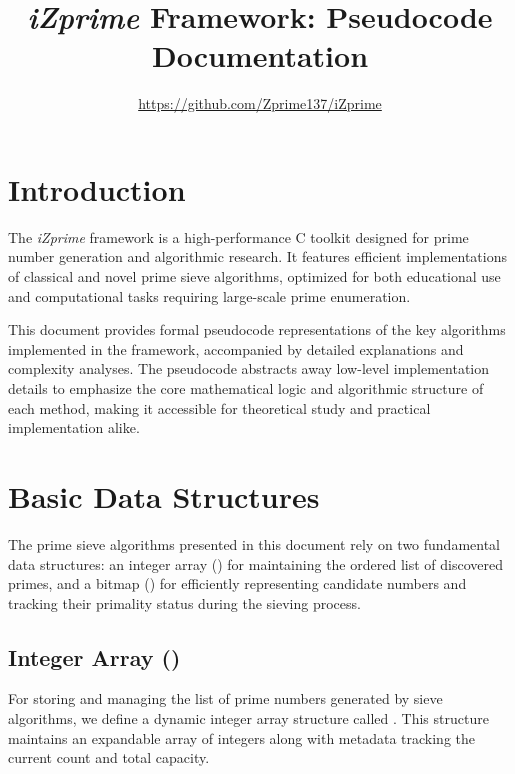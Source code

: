 \documentclass{article}
\begin{document}

\title{\emph{iZprime} Framework: Pseudocode Documentation}
\author{\small{\url{https://github.com/Zprime137/iZprime}}}
\maketitle

\section*{Introduction}

The \emph{iZprime} framework is a high-performance C toolkit designed for prime number generation and algorithmic research. It features efficient implementations of classical and novel prime sieve algorithms, optimized for both educational use and computational tasks requiring large-scale prime enumeration.

This document provides formal pseudocode representations of the key algorithms implemented in the framework, accompanied by detailed explanations and complexity analyses. The pseudocode abstracts away low-level implementation details to emphasize the core mathematical logic and algorithmic structure of each method, making it accessible for theoretical study and practical implementation alike.

\tableofcontents
\newpage

\section{Basic Data Structures}

The prime sieve algorithms presented in this document rely on two fundamental data structures: an integer array () for maintaining the ordered list of discovered primes, and a bitmap () for efficiently representing candidate numbers and tracking their primality status during the sieving process.

\subsection{Integer Array ()}

For storing and managing the list of prime numbers generated by sieve algorithms, we define a dynamic integer array structure called . This structure maintains an expandable array of integers along with metadata tracking the current count and total capacity.
\end{document}
